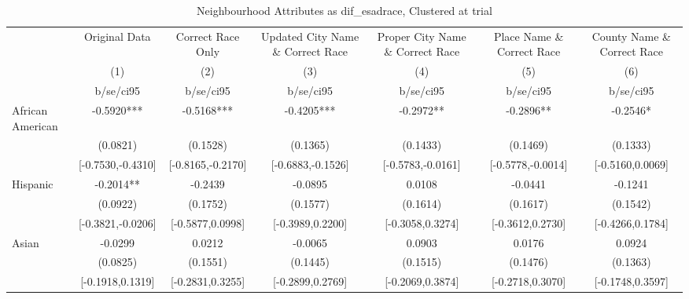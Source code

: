 \documentclass{article}
\begin{document}
\begin{table}[htbp]\centering
\def\sym#1{\ifmmode^{#1}\else\(^{#1}\)\fi}
\caption{Neighbourhood Attributes as dif\_esadrace, Clustered at trial}
\begin{tabular}{l*{6}{c}}
\toprule
                    &\multicolumn{1}{c}{Original Data}&\multicolumn{1}{c}{Correct Race Only}&\multicolumn{1}{c}{Updated City Name \& Correct Race}&\multicolumn{1}{c}{Proper City Name \& Correct Race}&\multicolumn{1}{c}{Place Name \& Correct Race}&\multicolumn{1}{c}{County Name \& Correct Race}\\\cmidrule(lr){2-2}\cmidrule(lr){3-3}\cmidrule(lr){4-4}\cmidrule(lr){5-5}\cmidrule(lr){6-6}\cmidrule(lr){7-7}
                    &\multicolumn{1}{c}{(1)}   &\multicolumn{1}{c}{(2)}   &\multicolumn{1}{c}{(3)}   &\multicolumn{1}{c}{(4)}   &\multicolumn{1}{c}{(5)}   &\multicolumn{1}{c}{(6)}   \\
                    &   b/se/ci95   &   b/se/ci95   &   b/se/ci95   &   b/se/ci95   &   b/se/ci95   &   b/se/ci95   \\
\midrule
African American    &     -0.5920***&     -0.5168***&     -0.4205***&     -0.2972** &     -0.2896** &     -0.2546*  \\
                    &    (0.0821)   &    (0.1528)   &    (0.1365)   &    (0.1433)   &    (0.1469)   &    (0.1333)   \\
                    &[-0.7530,-0.4310]   &[-0.8165,-0.2170]   &[-0.6883,-0.1526]   &[-0.5783,-0.0161]   &[-0.5778,-0.0014]   &[-0.5160,0.0069]   \\
Hispanic            &     -0.2014** &     -0.2439   &     -0.0895   &      0.0108   &     -0.0441   &     -0.1241   \\
                    &    (0.0922)   &    (0.1752)   &    (0.1577)   &    (0.1614)   &    (0.1617)   &    (0.1542)   \\
                    &[-0.3821,-0.0206]   &[-0.5877,0.0998]   &[-0.3989,0.2200]   &[-0.3058,0.3274]   &[-0.3612,0.2730]   &[-0.4266,0.1784]   \\
Asian               &     -0.0299   &      0.0212   &     -0.0065   &      0.0903   &      0.0176   &      0.0924   \\
                    &    (0.0825)   &    (0.1551)   &    (0.1445)   &    (0.1515)   &    (0.1476)   &    (0.1363)   \\
                    &[-0.1918,0.1319]   &[-0.2831,0.3255]   &[-0.2899,0.2769]   &[-0.2069,0.3874]   &[-0.2718,0.3070]   &[-0.1748,0.3597]   \\

\end{tabular}
\end{table}
\end{document}
